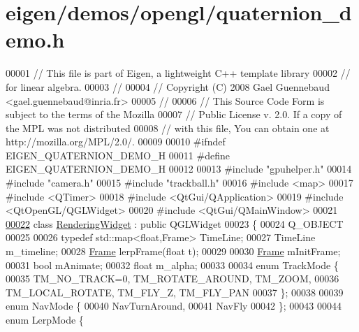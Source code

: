 \hypertarget{eigen_2demos_2opengl_2quaternion__demo_8h_source}{}\section{eigen/demos/opengl/quaternion\+\_\+demo.h}
\label{eigen_2demos_2opengl_2quaternion__demo_8h_source}

\begin{DoxyCode}
00001 \textcolor{comment}{// This file is part of Eigen, a lightweight C++ template library}
00002 \textcolor{comment}{// for linear algebra.}
00003 \textcolor{comment}{//}
00004 \textcolor{comment}{// Copyright (C) 2008 Gael Guennebaud <gael.guennebaud@inria.fr>}
00005 \textcolor{comment}{//}
00006 \textcolor{comment}{// This Source Code Form is subject to the terms of the Mozilla}
00007 \textcolor{comment}{// Public License v. 2.0. If a copy of the MPL was not distributed}
00008 \textcolor{comment}{// with this file, You can obtain one at http://mozilla.org/MPL/2.0/.}
00009 
00010 \textcolor{preprocessor}{#ifndef EIGEN\_QUATERNION\_DEMO\_H}
00011 \textcolor{preprocessor}{#define EIGEN\_QUATERNION\_DEMO\_H}
00012 
00013 \textcolor{preprocessor}{#include "gpuhelper.h"}
00014 \textcolor{preprocessor}{#include "camera.h"}
00015 \textcolor{preprocessor}{#include "trackball.h"}
00016 \textcolor{preprocessor}{#include <map>}
00017 \textcolor{preprocessor}{#include <QTimer>}
00018 \textcolor{preprocessor}{#include <QtGui/QApplication>}
00019 \textcolor{preprocessor}{#include <QtOpenGL/QGLWidget>}
00020 \textcolor{preprocessor}{#include <QtGui/QMainWindow>}
00021 
\hyperlink{class_rendering_widget}{00022} \textcolor{keyword}{class }\hyperlink{class_rendering_widget}{RenderingWidget} : \textcolor{keyword}{public} QGLWidget
00023 \{
00024   Q\_OBJECT
00025 
00026     \textcolor{keyword}{typedef} std::map<float,Frame> TimeLine;
00027     TimeLine m\_timeline;
00028     \hyperlink{class_frame}{Frame} lerpFrame(\textcolor{keywordtype}{float} t);
00029 
00030     \hyperlink{class_frame}{Frame} mInitFrame;
00031     \textcolor{keywordtype}{bool} mAnimate;
00032     \textcolor{keywordtype}{float} m\_alpha;
00033 
00034     \textcolor{keyword}{enum} TrackMode \{
00035       TM\_NO\_TRACK=0, TM\_ROTATE\_AROUND, TM\_ZOOM,
00036       TM\_LOCAL\_ROTATE, TM\_FLY\_Z, TM\_FLY\_PAN
00037     \};
00038 
00039     \textcolor{keyword}{enum} NavMode \{
00040       NavTurnAround,
00041       NavFly
00042     \};
00043 
00044     \textcolor{keyword}{enum} LerpMode \{

\end{DoxyCode}
